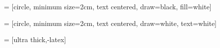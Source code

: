  = [circle,
minimum size=2cm,
text centered,
draw=black,
fill=white]

 = [circle,
minimum size=2cm,
text centered,
draw=white,
text=white]





 = [ultra thick,-latex]


